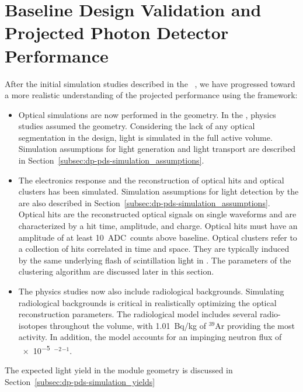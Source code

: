 \section{Baseline Design Validation and Projected Photon Detector Performance}
\label{sec:dp-pds-performance}

After the initial simulation studies described in the  ~\cite{Abi:2018rgm}, we have progressed toward a more realistic understanding of the projected  performance using the  framework:
%
\begin{itemize}
\item Optical simulations are now performed in the  geometry. In the  , physics studies assumed the  geometry. Considering the lack of any optical segmentation in the  design, light is simulated in the full  active volume. Simulation assumptions for light generation and light transport are described in Section~\ref{subsec:dp-pds-simulation_assumptions}. 
%
\item The electronics response and the reconstruction of optical hits and optical clusters has been simulated. Simulation assumptions for light detection by the  are also described in Section~\ref{subsec:dp-pds-simulation_assumptions}. Optical hits are the reconstructed optical signals on single  waveforms and are characterized by a hit time, amplitude, and charge. Optical hits must have an amplitude of at least \SI{10}{ADC counts} above baseline. Optical clusters refer to a collection of  hits correlated in time and space. They are typically induced by the same underlying flash of scintillation light in . The parameters of the clustering algorithm are discussed later in this section.

%
\item The physics studies now also include radiological backgrounds. Simulating radiological backgrounds is critical in realistically optimizing the optical reconstruction parameters. The radiological model includes several radio-isotopes throughout the  volume, with \SI{1.01}{\becquerel/\kg} of $^{39}$Ar providing the most activity. In addition, the model accounts for an impinging neutron flux of \SI{e-5}{\cm$^{-2}$\s$^{-1}$}. %
\end{itemize} 

The expected  light yield in the   module geometry is discussed in Section~\ref{subsec:dp-pds-simulation_yields}

